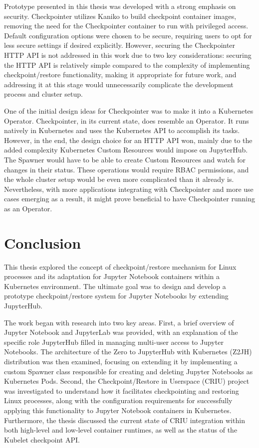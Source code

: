 \documentclass[
  digital,     %
  oneside,     %
  nosansbold,  %
  nocolorbold, %
  lof,         %
  nolot,         %
]{fithesis4}
\begin{document}
Prototype presented in this thesis was developed with a strong emphasis on security. Checkpointer utilizes Kaniko to build checkpoint container images, removing the need for the Checkpointer container to run with privileged access. Default configuration options were chosen to be secure, requiring users to opt for less secure settings if desired explicitly. However, securing the Checkpointer HTTP API is not addressed in this work due to two key considerations: securing the HTTP API is relatively simple compared to the complexity of implementing checkpoint/restore functionality, making it appropriate for future work, and addressing it at this stage would unnecessarily complicate the development process and cluster setup.

One of the initial design ideas for Checkpointer was to make it into a Kubernetes Operator. Checkpointer, in its current state, does resemble an Operator. It runs natively in Kubernetes and uses the Kubernetes API to accomplish its tasks. However, in the end, the design choice for an HTTP API won, mainly due to the added complexity Kubernetes Custom Resources would impose on JupyterHub. The Spawner would have to be able to create Custom Resources and watch for changes in their status. These operations would require RBAC permissions, and the whole cluster setup would be even more complicated than it already is. Nevertheless, with more applications integrating with Checkpointer and more use cases emerging as a result, it might prove beneficial to have Checkpointer running as an Operator.



\chapter{Conclusion}

This thesis explored the concept of checkpoint/restore mechanism for Linux processes and its adaptation for Jupyter Notebook containers within a Kubernetes environment. The ultimate goal was to design and develop a prototype checkpoint/restore system for Jupyter Notebooks by extending JupyterHub.

The work began with research into two key areas. First, a brief overview of Jupyter Notebook and JupyterLab was provided, with an explanation of the specific role JupyterHub filled in managing multi-user access to Jupyter Notebooks. The architecture of the Zero to JupyterHub with Kubernetes (Z2JH) distribution was then examined, focusing on extending it by implementing a custom Spawner class responsible for creating and deleting Jupyter Notebooks as Kubernetes Pods. Second, the Checkpoint/Restore in Userspace (CRIU) project was investigated to understand how it facilitates checkpointing and restoring Linux processes, along with the configuration requirements for successfully applying this functionality to Jupyter Notebook containers in Kubernetes. Furthermore, the thesis discussed the current state of CRIU integration within both high-level and low-level container runtimes, as well as the status of the Kubelet checkpoint API.
\end{document}
